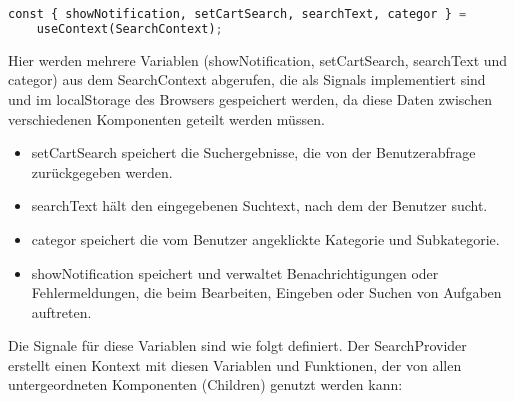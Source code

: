 \documentclass[12pt,a4paper]{article} %
\begin{document}
\begin{lstlisting}[language=Python]
  const { showNotification, setCartSearch, searchText, categor } =
    useContext(SearchContext);
 \end{lstlisting}  
 
Hier werden mehrere Variablen (showNotification, setCartSearch, searchText und categor) aus dem SearchContext abgerufen, die als Signals implementiert sind und im localStorage des Browsers gespeichert werden, da diese Daten zwischen verschiedenen Komponenten geteilt werden müssen.

\begin{itemize}
 \item   setCartSearch speichert die Suchergebnisse, die von der Benutzerabfrage zurückgegeben werden.
\item    searchText hält den eingegebenen Suchtext, nach dem der Benutzer sucht.
  \item  categor speichert die vom Benutzer angeklickte Kategorie und Subkategorie.
 \item   showNotification speichert und verwaltet Benachrichtigungen oder Fehlermeldungen, die beim Bearbeiten, Eingeben oder Suchen von Aufgaben auftreten.
    
\end{itemize}


Die Signale für diese Variablen sind wie folgt definiert. Der SearchProvider erstellt einen Kontext mit diesen Variablen und Funktionen, der von allen untergeordneten Komponenten (Children) genutzt werden kann:
    
\end{document}
